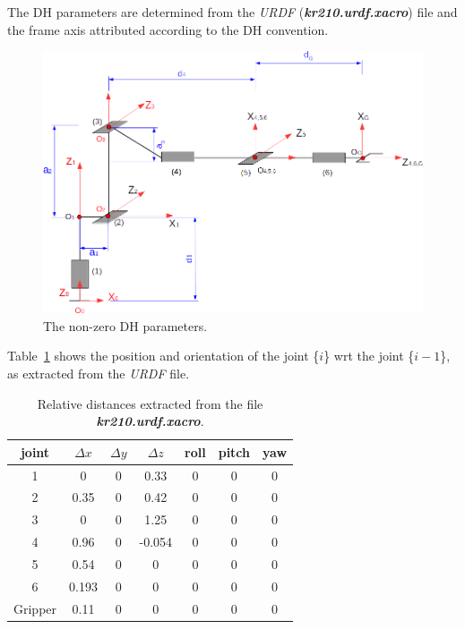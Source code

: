 \documentclass[a4paper,12pt]{report}
\begin{document}
The DH parameters are determined from the \textit{URDF} (\textit{\textbf{kr210.urdf.xacro}}) file and the frame axis attributed according to the DH convention.

\begin{figure}[H]
\centering
        \includegraphics[totalheight=12cm]{imgs/DH_parameters.png}
        \caption{The non-zero DH parameters.}
\end{figure}

Table~\ref{table:urdf} shows the position and orientation of the joint \{$i$\} wrt the joint  \{$i-1$\}, as extracted from the \textit{URDF} file.


\begin{table}[H]
\centering
\begin{tabular}{ | c | c | c | c| c |c|c| }
\hline
 joint & $\Delta x$ & $\Delta y$  & $\Delta z$ & roll & pitch & yaw \\ 
 \hline
1 & 0 & 0 & 0.33 & 0 & 0 & 0 \\  
 \hline
2 & 0.35 & 0 & 0.42 & 0 & 0 & 0 \\  
 \hline
3 & 0 & 0 & 1.25 & 0 & 0 & 0 \\   
 \hline
4 & 0.96 & 0 & -0.054 & 0 & 0 & 0 \\   
 \hline
5 & 0.54 & 0 & 0 & 0 & 0 & 0 \\   
 \hline
6 & 0.193 & 0 & 0 & 0 & 0 & 0 \\  
 \hline
Gripper & 0.11 & 0 & 0 & 0 & 0 & 0 \\  
   \hline 
\end{tabular}
\caption{Relative distances extracted from the file \textit{\textbf{kr210.urdf.xacro}}.}
\label{table:urdf}
\end{table}
\end{document}
